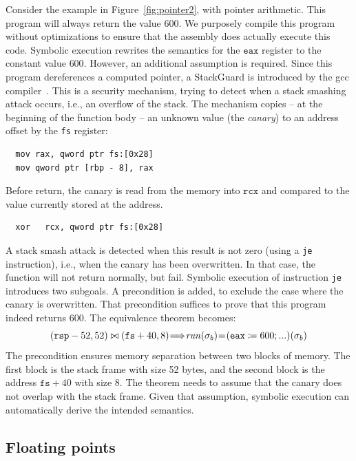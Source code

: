Consider the example in Figure~\ref{fig:pointer2}, with pointer arithmetic.
This program will always return the value $600$.
We purposely compile this program without optimizations to ensure that the assembly does actually execute this code.
Symbolic execution rewrites the semantics for the $\mathtt{eax}$ register to the constant value $600$.
However, an additional assumption is required.
Since this program dereferences a computed pointer, a StackGuard is introduced by the gcc compiler~\cite{cowan1999protecting}.
This is a security mechanism, trying to detect when a stack smashing attack occurs, i.e., an overflow of the stack.
The mechanism copies -- at the beginning of the function body -- an unknown value (the \emph{canary}) to an address offset by the \texttt{fs} register:
\begin{lstlisting}
  mov rax, qword ptr fs:[0x28]
  mov qword ptr [rbp - 8], rax
\end{lstlisting}
Before return, the canary is read from the memory into $\texttt{rcx}$ and compared to the value currently stored at the address.
\begin{lstlisting}
  xor	rcx, qword ptr fs:[0x28]
\end{lstlisting}
A stack smash attack is detected when this result is not zero (using a \texttt{je} instruction), i.e., when the canary has been overwritten.
In that case, the function will not return normally, but fail.
Symbolic execution of instruction \texttt{je} introduces two subgoals.
A precondition is added, to exclude the case where the canary is overwritten.
That precondition suffices to prove that this program indeed returns $600$.
The equivalence theorem becomes:
\[
(\mathtt{rsp} - 52, 52) \bowtie (\mathtt{fs} + 40, 8) \hspace{-0.5ex}\Longrightarrow \\
\hspace{-0.5ex}\mathit{run}(\sigma_b)\hspace{-0.5ex} =\hspace{-0.5ex} (\mathtt{eax} \coloneqq 600  ;...)(\sigma_b)
\]
The precondition ensures memory separation between two blocks of memory.
The first block is the stack frame with size 52 bytes, and the second block is the address $\mathtt{fs} + 40$ with size 8.
The theorem needs to assume that the canary does not overlap with the stack frame.
Given that assumption, symbolic execution can automatically derive the intended semantics.

\subsection{Floating points}


